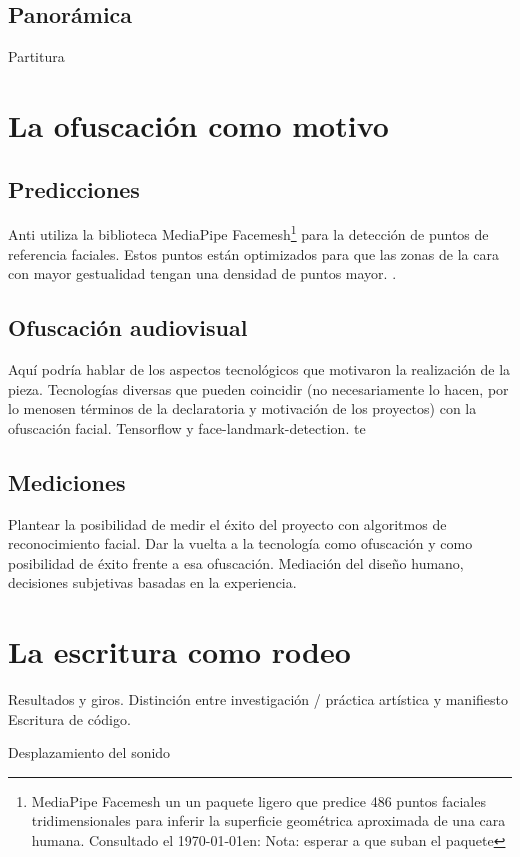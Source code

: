 \subsection{Panorámica}

Partitura

\section{La ofuscación como motivo}

\subsection{Predicciones}

Anti utiliza la biblioteca MediaPipe Facemesh\footnote{MediaPipe Facemesh un un paquete ligero que predice 486 puntos faciales tridimensionales para inferir la superficie geométrica aproximada de una cara humana. Consultado el \today en: Nota: esperar a que suban el paquete} para la detección de puntos de referencia faciales. Estos puntos están optimizados para que las zonas de la cara con mayor gestualidad tengan una densidad de puntos mayor. \citep{kartynnik2019realtime}.

\subsection{Ofuscación audiovisual}

Aquí podría hablar de los aspectos tecnológicos que motivaron la realización de la pieza. Tecnologías diversas que pueden coincidir (no necesariamente lo hacen, por lo menosen términos de la declaratoria y motivación de los proyectos) con la ofuscación facial. Tensorflow y face-landmark-detection. 
te

\subsection{Mediciones}

Plantear la posibilidad de medir el éxito del proyecto con algoritmos de reconocimiento facial. Dar la vuelta a la tecnología como ofuscación y como posibilidad de éxito frente a esa ofuscación. Mediación del diseño humano, decisiones subjetivas basadas en la experiencia. 

\section{La escritura como rodeo} %

Resultados y giros. 
Distinción entre investigación / práctica artística y manifiesto 
Escritura de código.


Desplazamiento del sonido 

